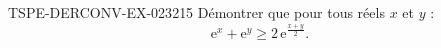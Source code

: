 \begin{exercice}{TSPE-DERCONV-EX-023}{2}{15}
Démontrer que pour tous réels $x$ et $y$ :
\[ \mathrm{e}^x + \mathrm{e}^y \geq 2\,\mathrm{e}^{\frac{x+y}{2}}. \]

\end{exercice}
